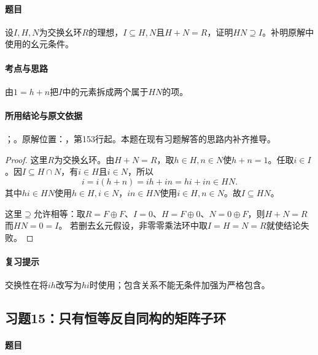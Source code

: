 \label{ex:3:14}

\paragraph{题目}

设$I,H,N$为交换幺环$R$的理想，$I\subseteq H,N$且$H+N=R$，证明$HN\supseteq I$。补明原解中使用的幺元条件。

\paragraph{考点与思路}

由$1=h+n$把$I$中的元素拆成两个属于$HN$的项。

\paragraph{所用结论与原文依据}

；。原解位置：，第153行起。本题在现有习题解答的思路内补齐推导。


\begin{proof}

这里$R$为交换幺环。由$H+N=R$，取$h\in H,n\in N$使$h+n=1$。任取$i\in I$。因$I\subseteq H\cap N$，有$i\in H$且$i\in N$，所以
\[
i=i(h+n)=ih+in=hi+in\in HN.
\]
其中$hi\in HN$使用$h\in H,i\in N$，$in\in HN$使用$i\in H,n\in N$。故$I\subseteq HN$。

这里$\supseteq$允许相等：取$R=F\oplus F$、$I=0$、$H=F\oplus0$、$N=0\oplus F$，则$H+N=R$而$HN=0=I$。
若删去幺元假设，非零零乘法环中取$I=H=N=R$就使结论失败。

\end{proof}

\paragraph{复习提示}

交换性在将$ih$改写为$hi$时使用；包含关系不能无条件加强为严格包含。



\subsection{习题15：只有恒等反自同构的矩阵子环}

\label{ex:3:15}

\paragraph{题目}

